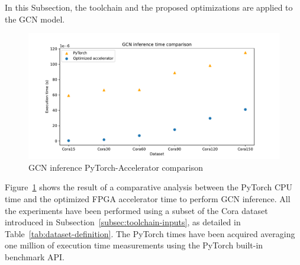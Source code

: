 In this Subsection, the toolchain and the proposed optimizations are applied to the GCN model.


\begin{figure}[t!]
    \centering
    \includegraphics[height=0.4\textwidth]{Images/gcn_forward_comparison}
    \caption{GCN inference PyTorch-Accelerator comparison}
    \label{fig:gcn-inference-comparison}
\end{figure}

Figure~\ref{fig:gcn-inference-comparison} shows the result of a comparative analysis between the PyTorch CPU time and the optimized FPGA accelerator time to perform GCN inference.
All the experiments have been performed using a subset of the Cora dataset introduced in Subsection~\ref{subsec:toolchain-inputs}, as detailed in Table~\ref{tab:dataset-definition}.
The PyTorch times have been acquired averaging one million of execution time measurements using the PyTorch built-in benchmark API\@.

